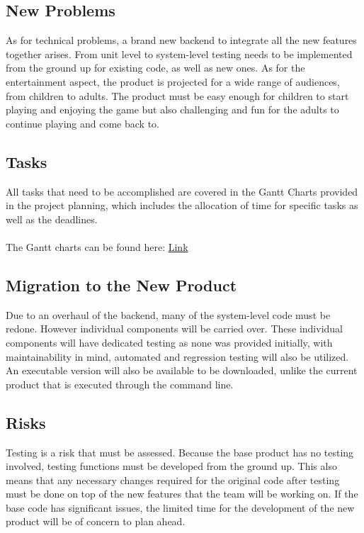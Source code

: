 \documentclass[12pt, titlepage]{article}
\begin{document}
\subsection{New Problems}

As for technical problems, a brand new backend to integrate all the new features together arises. From unit level to system-level testing needs to be implemented from the ground up for existing code, as well as new ones. As for the entertainment aspect, the product is projected for a wide range of audiences, from children to adults. The product must be easy enough for children to start playing and enjoying the game but also challenging and fun for the adults to continue playing and come back to. 

\subsection{Tasks}

All tasks that need to be accomplished are covered in the Gantt Charts provided in the project planning, which includes the allocation of time for specific tasks as well as the deadlines.\\
\\
The Gantt charts can be found here: \href{https://gitlab.cas.mcmaster.ca/balacs1/se3xa3-project/-/tree/master/ProjectSchedule}{Link}

\subsection{Migration to the New Product}

Due to an overhaul of the backend, many of the system-level code must be redone. However individual components will be carried over. These individual components will have dedicated testing as none was provided initially, with maintainability in mind, automated and regression testing will also be utilized. An executable version will also be available to be downloaded, unlike the current product that is executed through the command line.

\subsection{Risks}

Testing is a risk that must be assessed. Because the base product has no testing involved, testing functions must be developed from the ground up. This also means that any necessary changes required for the original code after testing must be done on top of the new features that the team will be working on. If the base code has significant issues, the limited time for the development of the new product will be of concern to plan ahead.
\end{document}
